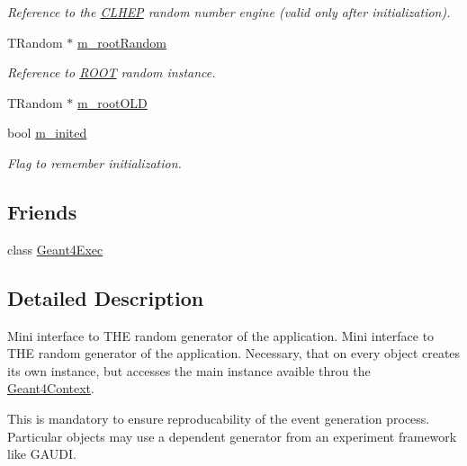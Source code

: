 \begin{DoxyCompactItemize}
\begin{DoxyCompactList}\small\item\em Reference to the \hyperlink{namespace_c_l_h_e_p}{CLHEP} random number engine (valid only after initialization). \item\end{DoxyCompactList}\item 
TRandom $\ast$ \hyperlink{class_d_d4hep_1_1_simulation_1_1_geant4_random_a026a1847cc9ce6ae7bae842fa6f4b452}{m\_\-rootRandom}
\begin{DoxyCompactList}\small\item\em Reference to \hyperlink{namespace_r_o_o_t}{ROOT} random instance. \item\end{DoxyCompactList}\item 
TRandom $\ast$ \hyperlink{class_d_d4hep_1_1_simulation_1_1_geant4_random_a55a93202818178faaeabd4ae322a208e}{m\_\-rootOLD}
\item 
bool \hyperlink{class_d_d4hep_1_1_simulation_1_1_geant4_random_aa8dd0cf1aa819f72ec19b69b6ae171c5}{m\_\-inited}
\begin{DoxyCompactList}\small\item\em Flag to remember initialization. \item\end{DoxyCompactList}\end{DoxyCompactItemize}
\subsection*{Friends}
\begin{DoxyCompactItemize}
\item 
class \hyperlink{class_d_d4hep_1_1_simulation_1_1_geant4_random_ac0f82c2b468e2eec2341f3740273273a}{Geant4Exec}
\end{DoxyCompactItemize}


\subsection{Detailed Description}
Mini interface to THE random generator of the application. Mini interface to THE random generator of the application. Necessary, that on every object creates its own instance, but accesses the main instance avaible throu the \hyperlink{class_d_d4hep_1_1_simulation_1_1_geant4_context}{Geant4Context}.

This is mandatory to ensure reproducability of the event generation process. Particular objects may use a dependent generator from an experiment framework like GAUDI.

